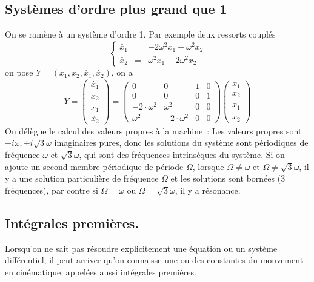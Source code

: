 \documentclass[a4paper,11pt]{book}
\begin{document}
\begin{giacjshere}
\subsection{Syst\`emes d'ordre plus grand que 1}
On se ram\`ene \`a un syst\`eme d'ordre 1.
Par exemple deux ressorts coupl\'es
$$ 
\left\{ 
\begin{array}{ccc}
\ddot{x_1}&=&-2\omega^2 x_1+\omega^2 x_2\\
\ddot{x_2}&=&\omega^2 x_1-2\omega^2x_2
\end{array}
\right. $$
on pose $Y=(x_1,x_2,\dot{x_1},\dot{x_2})$, on a
$$\dot{Y}=\left(
\begin{array}{c}\dot{x_1}\\\dot{x_2}\\\ddot{x_1}\\\ddot{x_2}\end{array}
\right)
=\left(\begin{array}{cccc}
0 & 0 & 1 & 0 \\
0 & 0 & 0 & 1 \\
-2\cdot \omega^{2} & \omega^{2} & 0 & 0 \\
\omega^{2} & -2\cdot \omega^{2} & 0 & 0
\end{array}\right) 
\left(
\begin{array}{c}x_1\\x_2\\\dot{x_1}\\\dot{x_2}\end{array}
\right)
$$ 
On d\'el\`egue le calcul des valeurs propres \`a la machine~:
Les valeurs propres sont $\pm i \omega, \pm i\sqrt{3} \omega$ imaginaires
pures, donc les solutions du syst\`eme sont p\'eriodiques
de fr\'equence $\omega$ et $\sqrt{3}\omega$, qui sont des fr\'equences
intrins\`eques du syst\`eme. Si on ajoute un second membre
p\'eriodique de p\'eriode $\Omega$, lorsque $\Omega \neq \omega$ et 
$\Omega \neq \sqrt{3}\omega$, il y a une solution particuli\`ere
de fr\'equence $\Omega$ et les solutions sont born\'ees (3 fr\'equences),
par contre si $\Omega=\omega$ ou $\Omega=\sqrt{3}\omega$, il y a r\'esonance.

\subsection{Int\'egrales premi\`eres.}
Lorsqu'on ne sait pas r\'esoudre explicitement une \'equation
ou un syst\`eme diff\'erentiel, il peut arriver qu'on connaisse
une ou des constantes du mouvement en cin\'ematique, appel\'ees
aussi int\'egrales premi\`eres. 


\end{giacjshere}
\end{document}
